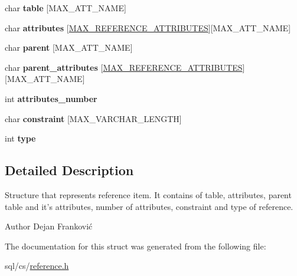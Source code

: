 \begin{DoxyCompactItemize}
\item 
\hypertarget{structAK__ref__item_a6605be7179a6bb7de63596f21e031fdb}{char {\bfseries table} \mbox{[}M\+A\+X\+\_\+\+A\+T\+T\+\_\+\+N\+A\+M\+E\mbox{]}}\label{structAK__ref__item_a6605be7179a6bb7de63596f21e031fdb}

\item 
\hypertarget{structAK__ref__item_aad3f2e85932e88100916097e3c1f6a41}{char {\bfseries attributes} \mbox{[}\hyperlink{reference_8h_a1892ca5d8fd96ba1813befff40c84ebd}{M\+A\+X\+\_\+\+R\+E\+F\+E\+R\+E\+N\+C\+E\+\_\+\+A\+T\+T\+R\+I\+B\+U\+T\+E\+S}\mbox{]}\mbox{[}M\+A\+X\+\_\+\+A\+T\+T\+\_\+\+N\+A\+M\+E\mbox{]}}\label{structAK__ref__item_aad3f2e85932e88100916097e3c1f6a41}

\item 
\hypertarget{structAK__ref__item_a812f807b2d92ad0cbc9370be98fb24cf}{char {\bfseries parent} \mbox{[}M\+A\+X\+\_\+\+A\+T\+T\+\_\+\+N\+A\+M\+E\mbox{]}}\label{structAK__ref__item_a812f807b2d92ad0cbc9370be98fb24cf}

\item 
\hypertarget{structAK__ref__item_a4c79ce00096ba5a132d7d11faa94163b}{char {\bfseries parent\+\_\+attributes} \mbox{[}\hyperlink{reference_8h_a1892ca5d8fd96ba1813befff40c84ebd}{M\+A\+X\+\_\+\+R\+E\+F\+E\+R\+E\+N\+C\+E\+\_\+\+A\+T\+T\+R\+I\+B\+U\+T\+E\+S}\mbox{]}\mbox{[}M\+A\+X\+\_\+\+A\+T\+T\+\_\+\+N\+A\+M\+E\mbox{]}}\label{structAK__ref__item_a4c79ce00096ba5a132d7d11faa94163b}

\item 
\hypertarget{structAK__ref__item_a69a83ced852fc6e01cfcb0615ad7fc63}{int {\bfseries attributes\+\_\+number}}\label{structAK__ref__item_a69a83ced852fc6e01cfcb0615ad7fc63}

\item 
\hypertarget{structAK__ref__item_ad1a4236d0f4737ff6cc6b2069e14d402}{char {\bfseries constraint} \mbox{[}M\+A\+X\+\_\+\+V\+A\+R\+C\+H\+A\+R\+\_\+\+L\+E\+N\+G\+T\+H\mbox{]}}\label{structAK__ref__item_ad1a4236d0f4737ff6cc6b2069e14d402}

\item 
\hypertarget{structAK__ref__item_ac9dadb8ee5112dce17f5dfa5e48b9692}{int {\bfseries type}}\label{structAK__ref__item_ac9dadb8ee5112dce17f5dfa5e48b9692}

\end{DoxyCompactItemize}


\subsection{Detailed Description}
Structure that represents reference item. It contains of table, attributes, parent table and it's attributes, number of attributes, constraint and type of reference. 

\begin{DoxyAuthor}{Author}
Dejan Franković 
\end{DoxyAuthor}


The documentation for this struct was generated from the following file\+:\begin{DoxyCompactItemize}
\item 
sql/cs/\hyperlink{reference_8h}{reference.\+h}\end{DoxyCompactItemize}
